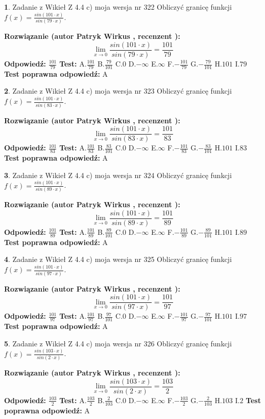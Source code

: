 \documentclass[12pt, a4paper]{article}
\theoremstyle{definition} %
\newtheorem{zad}{}
\newcommand{\zadStart}[1]{\begin{zad}#1\newline}
\newcommand{\zadStop}{\end{zad}}
\newcommand{\rozwStart}[2]{\noindent \textbf{Rozwiązanie (autor #1 , recenzent #2): }\newline}
\newcommand{\rozwStop}{\newline}
\newcommand{\odpStart}{\noindent \textbf{Odpowiedź:}\newline}
\newcommand{\odpStop}{\newline}
\newcommand{\testStart}{\noindent \textbf{Test:}\newline}
\newcommand{\testStop}{\newline}
\newcommand{\kluczStart}{\noindent \textbf{Test poprawna odpowiedź:}\newline}
\newcommand{\kluczStop}{\newline}
\begin{document}
\zadStart{Zadanie z Wikieł Z 4.4 c) moja wersja nr 322}
Obliczyć granicę funkcji $f(x)=\frac{sin(101\cdot x)}{sin(79\cdot x)}$.
\zadStop
\rozwStart{Patryk Wirkus}{}
$$\lim\limits_{x\to 0}\frac{sin(101\cdot x)}{sin(79\cdot x)}=
\frac{101}{79}$$
\rozwStop
\odpStart
$\frac{101}{79}$
\odpStop
\testStart
A.$\frac{101}{79}$
B.$\frac{79}{101}$
C.$0$
D.$-\infty$
E.$\infty$
F.$-\frac{101}{79}$
G.$-\frac{79}{101}$
H.$101$
I.$79$
\testStop
\kluczStart
A
\kluczStop



\zadStart{Zadanie z Wikieł Z 4.4 c) moja wersja nr 323}
Obliczyć granicę funkcji $f(x)=\frac{sin(101\cdot x)}{sin(83\cdot x)}$.
\zadStop
\rozwStart{Patryk Wirkus}{}
$$\lim\limits_{x\to 0}\frac{sin(101\cdot x)}{sin(83\cdot x)}=
\frac{101}{83}$$
\rozwStop
\odpStart
$\frac{101}{83}$
\odpStop
\testStart
A.$\frac{101}{83}$
B.$\frac{83}{101}$
C.$0$
D.$-\infty$
E.$\infty$
F.$-\frac{101}{83}$
G.$-\frac{83}{101}$
H.$101$
I.$83$
\testStop
\kluczStart
A
\kluczStop



\zadStart{Zadanie z Wikieł Z 4.4 c) moja wersja nr 324}
Obliczyć granicę funkcji $f(x)=\frac{sin(101\cdot x)}{sin(89\cdot x)}$.
\zadStop
\rozwStart{Patryk Wirkus}{}
$$\lim\limits_{x\to 0}\frac{sin(101\cdot x)}{sin(89\cdot x)}=
\frac{101}{89}$$
\rozwStop
\odpStart
$\frac{101}{89}$
\odpStop
\testStart
A.$\frac{101}{89}$
B.$\frac{89}{101}$
C.$0$
D.$-\infty$
E.$\infty$
F.$-\frac{101}{89}$
G.$-\frac{89}{101}$
H.$101$
I.$89$
\testStop
\kluczStart
A
\kluczStop



\zadStart{Zadanie z Wikieł Z 4.4 c) moja wersja nr 325}
Obliczyć granicę funkcji $f(x)=\frac{sin(101\cdot x)}{sin(97\cdot x)}$.
\zadStop
\rozwStart{Patryk Wirkus}{}
$$\lim\limits_{x\to 0}\frac{sin(101\cdot x)}{sin(97\cdot x)}=
\frac{101}{97}$$
\rozwStop
\odpStart
$\frac{101}{97}$
\odpStop
\testStart
A.$\frac{101}{97}$
B.$\frac{97}{101}$
C.$0$
D.$-\infty$
E.$\infty$
F.$-\frac{101}{97}$
G.$-\frac{97}{101}$
H.$101$
I.$97$
\testStop
\kluczStart
A
\kluczStop



\zadStart{Zadanie z Wikieł Z 4.4 c) moja wersja nr 326}
Obliczyć granicę funkcji $f(x)=\frac{sin(103\cdot x)}{sin(2\cdot x)}$.
\zadStop
\rozwStart{Patryk Wirkus}{}
$$\lim\limits_{x\to 0}\frac{sin(103\cdot x)}{sin(2\cdot x)}=
\frac{103}{2}$$
\rozwStop
\odpStart
$\frac{103}{2}$
\odpStop
\testStart
A.$\frac{103}{2}$
B.$\frac{2}{103}$
C.$0$
D.$-\infty$
E.$\infty$
F.$-\frac{103}{2}$
G.$-\frac{2}{103}$
H.$103$
I.$2$
\testStop
\kluczStart
A
\kluczStop
\end{document}
